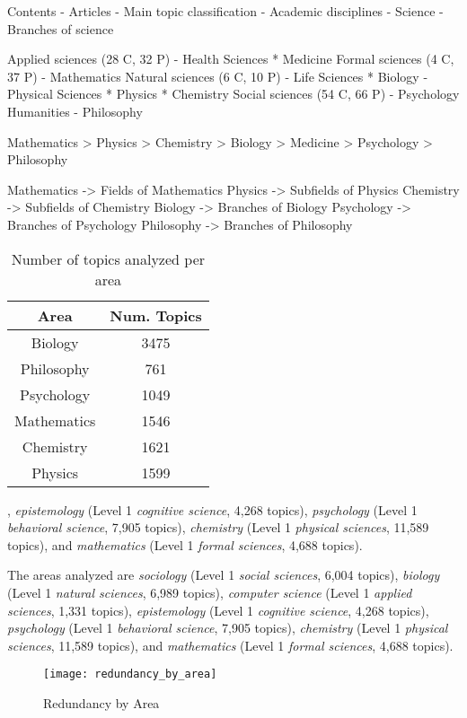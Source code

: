 Contents - Articles - Main topic classification - Academic disciplines - Science - Branches of science


Applied sciences (28 C, 32 P)
 - Health Sciences
   * Medicine
Formal sciences (4 C, 37 P)
 - Mathematics
Natural sciences (6 C, 10 P)
 - Life Sciences
   * Biology
 - Physical Sciences
   * Physics
   * Chemistry
Social sciences (54 C, 66 P)
 - Psychology
Humanities
 - Philosophy

Mathematics > Physics > Chemistry > Biology > Medicine > Psychology > Philosophy

Mathematics -> Fields of Mathematics
Physics         -> Subfields of Physics
Chemistry     -> Subfields of Chemistry 
Biology         -> Branches of Biology
Psychology    -> Branches of Psychology
Philosophy    -> Branches of Philosophy
 

\begin{table}
\begin{centering}
\begin{tabular}{|c|c|}
\hline 
Area & Num. Topics \tabularnewline
\hline 
\hline
Biology & 3475 \tabularnewline
\hline
Philosophy & 761 \tabularnewline
\hline
Psychology & 1049 \tabularnewline
\hline
Mathematics & 1546 \tabularnewline
\hline
Chemistry & 1621 \tabularnewline
\hline
Physics & 1599 \tabularnewline
\hline
\end{tabular}
\par\end{centering}
\caption{\label{tab:num_topics_per_area}Number of topics analyzed per area}
\end{table}

, \emph{epistemology} (Level 1 \emph{cognitive science}, 4,268 topics), \emph{psychology} (Level 1 \emph{behavioral science}, 7,905 topics), \emph{chemistry} (Level 1 \emph{physical sciences}, 11,589 topics), and \emph{mathematics} (Level 1 \emph{formal sciences}, 4,688 topics).

The areas analyzed are \emph{sociology} (Level 1 \emph{social sciences}, 6,004 topics),
\emph{biology} (Level 1 \emph{natural sciences}, 6,989 topics), \emph{computer science} (Level 1 \emph{applied sciences}, 1,331 topics), \emph{epistemology} (Level 1 \emph{cognitive science}, 4,268 topics), \emph{psychology} (Level 1 \emph{behavioral science}, 7,905 topics), \emph{chemistry} (Level 1 \emph{physical sciences}, 11,589 topics), and \emph{mathematics} (Level 1 \emph{formal sciences}, 4,688 topics).

\begin{figure}[h]
\centering\texttt{[image: redundancy\_by\_area]}
\caption{\label{fig:Surfeit-of-Topics}Redundancy by Area}
\end{figure}


